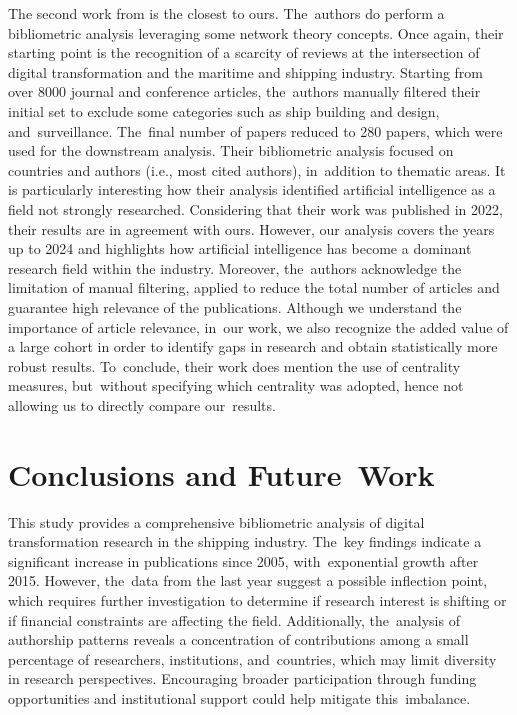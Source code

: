 \documentclass[jmse,review,accept,pdftex,moreauthors]{Definitions/mdpi}
\begin{document}
The second work from \citep{jovic2022digitalization} is the closest to ours. The~authors do perform a bibliometric analysis leveraging some network theory concepts. Once again, their starting point is the recognition of a scarcity of reviews at the intersection of digital transformation and the maritime and shipping industry. Starting from over 8000 journal and conference articles, the~authors manually filtered their initial set to exclude some categories such as ship building and design, and~surveillance. The~final number of papers reduced to 280 papers, which were used for the downstream analysis. Their bibliometric analysis focused on countries and authors (i.e., most cited authors), in~addition to thematic areas. It is particularly interesting how their analysis identified artificial intelligence as a field not strongly researched. Considering that their work was published in 2022, their results are in agreement with ours. However, our analysis covers the years up to 2024 and highlights how artificial intelligence has become a dominant research field within the industry. Moreover, the~authors acknowledge the limitation of manual filtering, applied to reduce the total number of articles and guarantee high relevance of the publications. {Although we understand the importance of article relevance, in~our work, we also recognize the added value of a large cohort in order to identify gaps in research and obtain statistically more robust results.} %
To~conclude, their work does mention the use of centrality measures, but~without specifying which centrality was adopted, hence not allowing us to directly compare our~results.	 

\section{Conclusions and Future~Work}
This study provides a comprehensive bibliometric analysis of digital transformation research in the shipping industry. The~key findings indicate a significant increase in publications since 2005, with~exponential growth after 2015. However, the~data from the last year suggest a possible inflection point, which requires further investigation to determine if research interest is shifting or if financial constraints are affecting the field. Additionally, the~analysis of authorship patterns reveals a concentration of contributions among a small percentage of researchers, institutions, and~countries, which may limit diversity in research perspectives. Encouraging broader participation through funding opportunities and institutional support could help mitigate this~imbalance.
\end{document}

